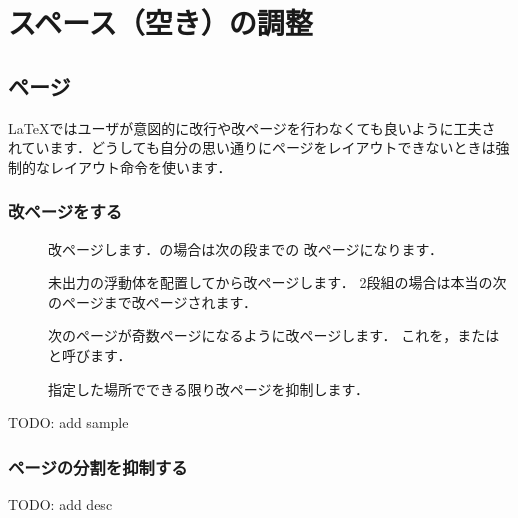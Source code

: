 \chapter{スペース（空き）の調整}


\section{ページ}

{\LaTeX}ではユーザが意図的に改行や改ページを行わなくても良いように工夫さ
れています．どうしても自分の思い通りにページをレイアウトできないときは強
制的なレイアウト命令を使います．%

\subsection{改ページをする}
\begin{usage}
\newpage         %
\clearpage       %
\cleardoublepage %
\end{usage}

\begin{description}
\item[] 
   改ページします．の場合は次の段までの
  改ページになります．
\item[]	
   未出力の浮動体を配置してから改ページします．
 2段組の場合は本当の次のページまで改ページされます． 
\item[] 
  次のページが奇数ページになるように改ページします．
  これを{}，または{}と呼びます．
\item[] 
   指定した場所でできる限り改ページを抑制します．
\end{description}

TODO: add sample

\subsection{ページの分割を抑制する}

TODO: add desc

\begin{usage}
\nopagebreak[$\<0〜4>$] %
\pagebreak[$\<0〜4>$]   %
\linebreak[$\<0〜4>$]   %
\nolinebreak[$\<0〜4>$] %
\end{usage}

